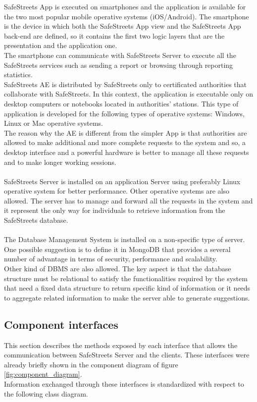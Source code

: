 \documentclass{article}
\begin{document}
   		SafeStreets App is executed on smartphones and the application is available for the two most popular mobile operative systems (iOS/Android).
   		The smartphone is the device in which both the SafeStreets App view and the SafeStreets App back-end are defined, so it contains the first two logic layers that are the presentation and the application one.\\
   		The smartphone can communicate with SafeStreets Server to execute all the SafeStreets services such as sending a report or browsing through reporting statistics.\\
   		SafeStreets AE is distributed by SafeStreets only to certificated authorities that collaborate with SafeStreets. In this context, the application is executable only on desktop computers or notebooks located in authorities' stations. This type of application is developed for the following types of operative systems: Windows, Linux or Mac operative systems.\\
   		The reason why the AE is different from the simpler App is that authorities are allowed to make additional and more complete requests to the system and so, a desktop interface and a powerful hardware is better to manage all these requests and to make longer working sessions.\\
   		\\
   		SafeStreets Server is installed on an application Server using preferably Linux operative system for better performance. Other operative systems are also allowed. The server has to manage and forward all the requests in the system and it represent the only way for individuals to retrieve information from the SafeStreets database.\\
   		\\
   		The Database Management System is installed on a non-specific type of server. One possible suggestion is to define it in MongoDB that provides a several number of advantage in terms of security, performance and scalability.\\
   		Other kind of DBMS are also allowed. The key aspect is that the database structure must be relational to satisfy the functionalities required by the system that need a fixed data structure to return specific kind of information or it needs to aggregate related information to make the server able to generate suggestions.
		
		\clearpage
		\subsection{Component interfaces}
		This section describes the methods exposed by each interface that allows the communication between SafeStreets Server and the clients. These interfaces were already briefly shown in the component diagram of figure \ref{fig:component_diagram}.\\
		Information exchanged through these interfaces is standardized with respect to the following class diagram.\\
		
\end{document}
